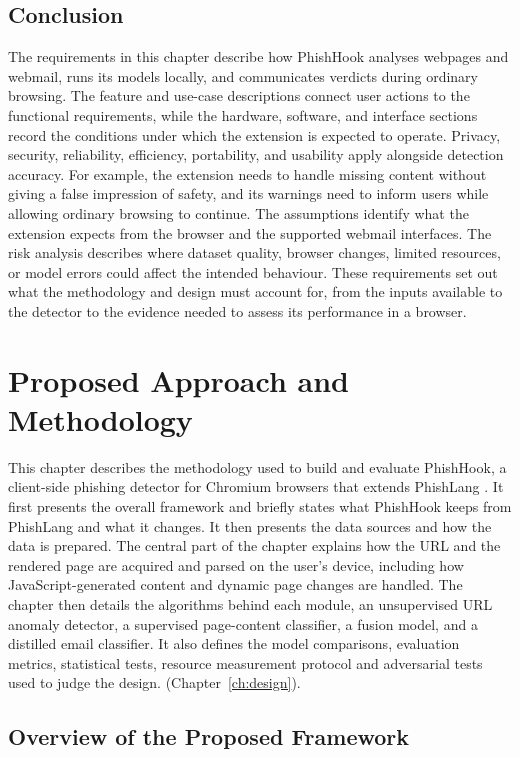 \documentclass{FastFyp}
\begin{document}
\section{Conclusion}
The requirements in this chapter describe how PhishHook analyses webpages and webmail, runs its models locally, and communicates verdicts during ordinary browsing. The feature and use-case descriptions connect user actions to the functional requirements, while the hardware, software, and interface sections record the conditions under which the extension is expected to operate. Privacy, security, reliability, efficiency, portability, and usability apply alongside detection accuracy. For example, the extension needs to handle missing content without giving a false impression of safety, and its warnings need to inform users while allowing ordinary browsing to continue. The assumptions identify what the extension expects from the browser and the supported webmail interfaces. The risk analysis describes where dataset quality, browser changes, limited resources, or model errors could affect the intended behaviour. These requirements set out what the methodology and design must account for, from the inputs available to the detector to the evidence needed to assess its performance in a browser.

\chapter{Proposed Approach and Methodology}
\label{ch:methodology}

This chapter describes the methodology used to build and evaluate PhishHook, a client-side phishing detector for Chromium browsers that extends PhishLang \cite{phishlang2026}. It first presents the overall framework and briefly states what PhishHook keeps from PhishLang and what it changes. It then presents the data sources and how the data is prepared. The central part of the chapter explains how the URL and the rendered page are acquired and parsed on the user's device, including how JavaScript-generated content and dynamic page changes are handled. The chapter then details the algorithms behind each module, an unsupervised URL anomaly detector, a supervised page-content classifier, a fusion model, and a distilled email classifier. It also defines the model comparisons, evaluation metrics, statistical tests, resource measurement protocol and adversarial tests used to judge the design. (Chapter~\ref{ch:design}).

\section{Overview of the Proposed Framework}
\label{sec:framework}
\end{document}
